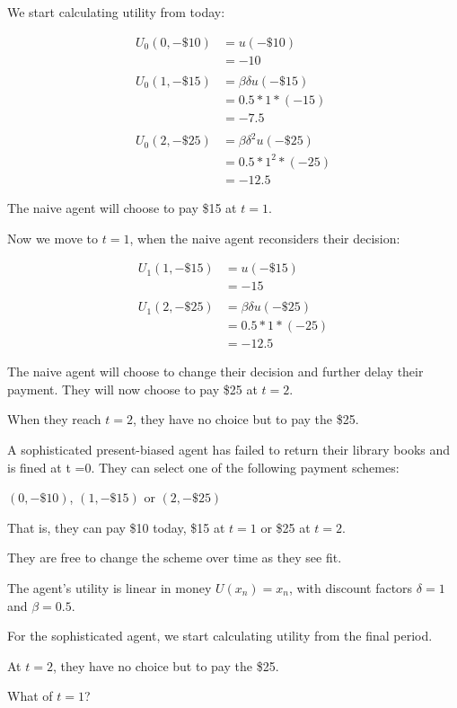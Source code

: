 \documentclass[
  letterpaper,
  DIV=11,
  numbers=noendperiod]{scrreprt}
\begin{document}
We start calculating utility from today:

\begin{align*}
U_0(0,-\$10)&=u(-\$10) \\
&=-10 \\
\\
U_0(1,-\$15)&=\beta\delta u(-\$15) \\
&=0.5*1*(-15) \\
&=-7.5 \\
\\
U_0(2,-\$25)&=\beta\delta^2 u(-\$25) \\
&=0.5*1^2*(-25) \\
&=-12.5
\end{align*}

The naive agent will choose to pay \$15 at \(t=1\).

Now we move to \(t=1\), when the naive agent reconsiders their decision:

\begin{align*}
U_1(1,-\$15)&=u(-\$15) \\
&=-15 \\
\\
U_1(2,-\$25)&=\beta\delta u(-\$25) \\
&=0.5*1*(-25) \\
&=-12.5
\end{align*}

The naive agent will choose to change their decision and further delay
their payment. They will now choose to pay \$25 at \(t=2\).

When they reach \(t=2\), they have no choice but to pay the \$25.

A sophisticated present-biased agent has failed to return their library
books and is fined at t =0. They can select one of the following payment
schemes:

\((0,-\$10)\), \((1,-\$15)\) or \((2,-\$25)\)

That is, they can pay \$10 today, \$15 at \(t=1\) or \$25 at \(t=2\).

They are free to change the scheme over time as they see fit.

The agent's utility is linear in money \(U(x_n)=x_n\), with discount
factors \(\delta=1\) and \(\beta=0.5\).

For the sophisticated agent, we start calculating utility from the final
period.

At \(t=2\), they have no choice but to pay the \$25.

What of \(t=1\)?
\end{document}
